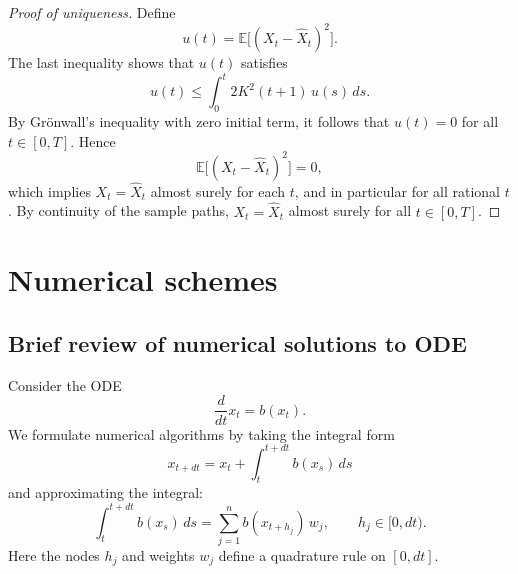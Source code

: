 \documentclass[11pt]{article}
\begin{document}
\begin{proof}[Proof of uniqueness]
Define
\begin{equation}
u(t) = \mathbb{E}\big[(X_t - \hat{X}_t)^2\big].
\end{equation}
The last inequality shows that $u(t)$ satisfies
\begin{equation}
u(t) \le \int_0^t 2K^2(t+1)\,u(s)\,ds.
\end{equation}
By Gr\"onwall's inequality with zero initial term, it follows that $u(t) = 0$ for all $t \in [0,T]$. Hence
\begin{equation}
\mathbb{E}\big[(X_t - \hat{X}_t)^2\big] = 0,
\end{equation}
which implies $X_t = \hat{X}_t$ almost surely for each $t$, and in particular for all rational $t$. By continuity of the sample paths, $X_t = \hat{X}_t$ almost surely for all $t\in[0,T]$. 
\end{proof}




\section*{Numerical schemes}

\subsection*{Brief review of numerical solutions to ODE}

Consider the ODE
\begin{equation}
\frac{d}{dt} x_t = b(x_t).
\end{equation}
We formulate numerical algorithms by taking the integral form 
\begin{equation}
x_{t+dt} = x_t + \int_t^{t+dt} b(x_s)\,ds
\end{equation}
and approximating the integral: 
\begin{equation}
 \int_t^{t+dt} b(x_s)\,ds 
 =
 \sum_{j=1}^n b(x_{t+h_j})\, w_j,
 \qquad
 h_j \in [0,dt).
\end{equation}
Here the nodes $h_j$ and weights $w_j$ define a quadrature rule on $[0,dt]$.
\end{document}
